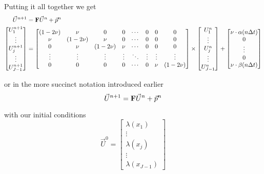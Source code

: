 \documentclass[12pt]{article}
\begin{document}
Putting it all together we get
\begin{align*}
	\vec{U}^{n + 1} &= {\bf F} \vec{U}^n + \vec{p}^n \\
	\begin{bmatrix}
		U^{n + 1}_1 \\
		\vdots \\
		U^{n + 1}_j \\
		\vdots \\
		U^{n + 1}_{J - 1}
	\end{bmatrix} 
	&=
	\begin{bmatrix}
		(1 - 2\nu) & \nu & 0 & 0 & \cdots & 0 & 0 & 0 \\
		\nu & (1 - 2\nu) & \nu & 0 & \cdots & 0 & 0 & 0 \\
		0 & \nu & (1 - 2\nu) & \nu & \cdots & 0 & 0 & 0 \\
		\vdots & \vdots & \vdots & \vdots & \ddots & \vdots & \vdots & \vdots \\
		0 & 0 & 0 & 0 & \cdots & 0 & \nu & (1 - 2\nu)
	\end{bmatrix} \times
	\begin{bmatrix}
		U^n_1 \\
		\vdots \\
		U^n_j \\
		\vdots \\
		U^n_{J - 1}
	\end{bmatrix} +
	\begin{bmatrix}
		\nu \cdot \alpha(n\Delta t) \\
		0 \\ 
		\vdots \\
		0 \\
		\nu \cdot \beta(n\Delta t)
	\end{bmatrix}
\end{align*}

or in the more succinct notation introduced earlier
\begin{equation*}
	\vec{U}^{n + 1} = {\bf F}\vec{U}^n + \vec{p}^n
\end{equation*}

with our initial conditions
\begin{equation*}
	\vec{U}^0 = 
	\begin{bmatrix}
		\lambda(x_1) \\
		\vdots \\
		\lambda(x_j) \\
		\vdots \\
		\lambda(x_{J - 1})
	\end{bmatrix}
\end{equation*}
\end{document}
